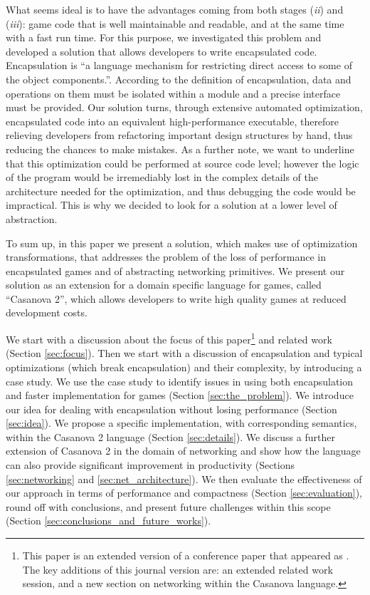 What seems ideal is to have the advantages coming from both stages (\textit{ii}) and (\textit{iii}): game code that is well maintainable and readable, and at the same time with a fast run time. For this purpose, we investigated this problem and developed a solution that allows developers to write encapsulated code. Encapsulation is ``a language mechanism for restricting direct access to some of the object components.''. According to the definition of encapsulation, data and operations on them must be isolated within a module and a precise interface must be provided. Our solution turns, through extensive automated optimization, encapsulated code into an equivalent high-performance executable, therefore relieving developers from refactoring important design structures by hand, thus reducing the chances to make mistakes. As a further note, we want to underline that this optimization could be performed at source code level; however the logic of the program would be irremediably lost in the complex details of the architecture needed for the optimization, and thus debugging the code would be impractical. This is why we decided to look for a solution at a lower level of abstraction.


To sum up, in this paper we present a solution, which makes use of optimization transformations, that addresses the problem of the loss of performance in encapsulated games and of abstracting networking primitives. We present our solution as an extension for a domain specific language for games, called ``Casanova 2'', which allows developers to write high quality games at reduced development costs. 

We start with a discussion about the focus of this paper\footnote{This paper is an extended version of a conference paper that appeared as \cite{abbadi2015high}. The key additions of this journal version are: an extended related work session, and a new section on networking within the Casanova language.} and related work (Section \ref{sec:focus}). Then we start with a discussion of encapsulation and typical optimizations (which break encapsulation) and their complexity, by introducing a case study. We use the case study to identify issues in using both encapsulation and faster implementation for games (Section \ref{sec:the_problem}). We introduce our idea for dealing with encapsulation without losing performance (Section \ref{sec:idea}). We propose a specific implementation, with corresponding semantics, within the Casanova 2 language (Section \ref{sec:details}). We discuss a further extension of Casanova 2 in the domain of networking and show how the language can also provide significant improvement in productivity (Sections \ref{sec:networking} and \ref{sec:net_architecture}). We then evaluate the effectiveness of our approach in terms of performance and compactness (Section \ref{sec:evaluation}), round off with conclusions, and present future challenges within this scope (Section \ref{sec:conclusions_and_future_works}).

